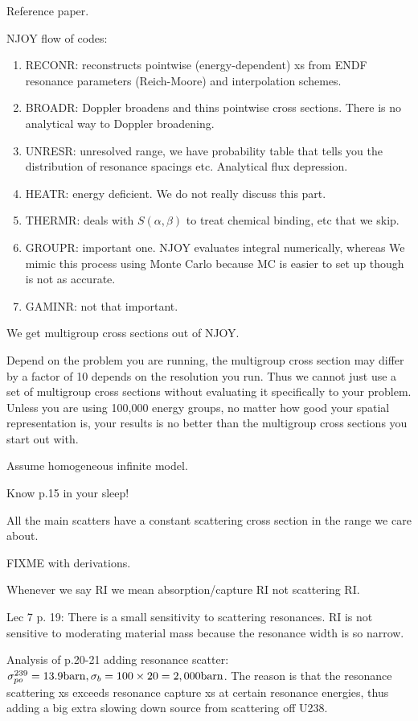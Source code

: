 \documentclass{school-22.211-notes}
\date{February 27, 2012}
\begin{document}
\maketitle

Reference paper. 

NJOY flow of codes:
\begin{enumerate}
\item RECONR: reconstructs pointwise (energy-dependent) xs from ENDF resonance parameters (Reich-Moore) and interpolation schemes. 
\item BROADR: Doppler broadens and thins pointwise cross sections. There is no analytical way to Doppler broadening. 
\item UNRESR: unresolved range, we have probability table that tells you the distribution of resonance spacings etc. Analytical flux depression. 
\item HEATR: energy deficient. We do not really discuss this part. 
\item THERMR: deals with $S(\alpha, \beta)$ to treat chemical binding, etc that we skip.
\item GROUPR: important one. NJOY evaluates integral numerically, whereas We mimic this process using Monte Carlo because MC is easier to set up though is not as accurate. 
\item GAMINR: not that important. 
\end{enumerate}
We get multigroup cross sections out of NJOY. 


Depend on the problem you are running, the multigroup cross section may differ by a factor of 10 depends on the resolution you run. Thus we cannot just use a set of multigroup cross sections without evaluating it specifically to your problem. Unless you are using 100,000 energy groups, no matter how good your spatial representation is, your results is no better than the multigroup cross sections you start out with. 


Assume homogeneous infinite model. 

Know p.15 in your sleep! 

All the main scatters have a constant scattering cross section in the range we care about. 


\clearpage
{}
FIXME with derivations. 


Whenever we say RI we mean absorption/capture RI not scattering RI. 


Lec 7 p. 19: There is a small sensitivity to scattering resonances. 
RI is not sensitive to moderating material mass because the resonance width is so narrow. 

Analysis of p.20-21 adding resonance scatter: $\sigma_{po}^{239} = 13.9 \mathrm{barn}, \sigma_b = 100 \times 20 = 2,000 \mathrm{barn}$. The reason is that the resonance scattering xs exceeds resonance capture xs at certain resonance energies, thus adding a big extra slowing down source from scattering off U238. 










\clearpage
\end{document}
